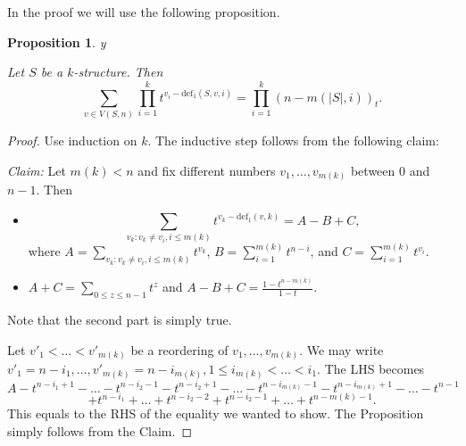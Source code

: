 \documentclass{amsart}
\theoremstyle{plain}
\newtheorem{proposition}{Proposition}[section]
\theoremstyle{definition}
\theoremstyle{remark}
\def\printname#1{
        \if\draft y
                \smash{\makebox[0pt]{\hspace{-0.5in}
                        \raisebox{8pt}{\tt\tiny #1}}}
        \fi
}
\def\lbl#1{\label{#1}\printname{#1}}
\def\defect{\mathrm{def}}
\begin{document}
In the proof we will use the following proposition.

\begin{proposition}
\lbl{prop.str2}
Let $S$ be a $k$-structure. Then
$$
\sum_{v\in V(S,n)}\prod_{i=1}^k t^{v_i-\defect_1(S,v,i)}
= \prod_{i=1}^k (n-m(|S|,i))_{t}.
$$
\end{proposition}


\begin{proof}
Use induction on $k$. The inductive step follows from the following claim:

{\em Claim:}
Let $m(k)< n$ and fix different numbers $v_1,\dots, v_{m(k)}$ between $0$ 
and $n-1$.
Then 
\begin{itemize}
\item
$$
\sum_{v_k: v_k\neq v_i, i\leq m(k)} t^{v_k-\defect_1(v,k)}= A-B+C,
$$
where
$A=\sum_{v_k: v_k\neq v_i, i\leq m(k)} t^{v_k}$, $B=\sum_{i=1}^{m(k)} 
t^{n-i}$, and
$C=\sum_{i=1}^{m(k)} t^{v_i}$.
\item
$A+C= \sum_{0\leq z\leq n-1}t^z$ and $A-B+C= \frac{1-t^{n-m(k)}}{1-t}$.
\end{itemize}


Note that the second part is simply true. 

Let $v'_1 < \dots < v'_{m(k)}$ be a reordering of $v_1,\dots, v_{m(k)}$.
We may write $v'_1=n-i_1, \dots,v'_{m(k)}=n-i_{m(k)}, 
1\leq i_{m(k)}<\dots <i_1$. 
The LHS becomes
$$
A -t^{n-i_1+1}-\dots -t^{n-i_2-1}-t^{n-i_2+1}-\dots 
-t^{n-i_{m(k)}-1}-t^{n-i_{m(k)}+1}-\dots -t^{n-1}
$$
$$
+ t^{n-i_1}+\dots +t^{n-i_2-2}+t^{n-i_2-1}+\dots +t^{n-m(k)-1}.
$$
This equals to the RHS of the equality we wanted to show. The Proposition 
simply follows
from the Claim.
\end{proof}
\end{document}
